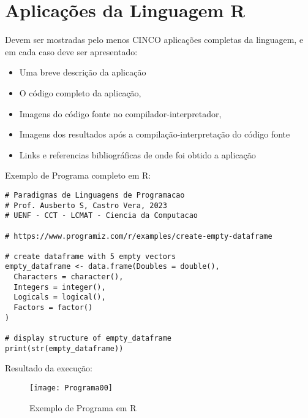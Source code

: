 %


\chapter{ Aplica\c{c}\~{o}es da Linguagem R}

Devem ser mostradas pelo menos CINCO aplica\c{c}\~{o}es completas da linguagem, e em cada caso deve ser apresentado:
\begin{itemize}
  \item Uma breve descri\c{c}\~{a}o da aplica\c{c}\~{a}o
  \item O c\'{o}digo completo da aplica\c{c}\~{a}o,
  \item Imagens do c\'{o}digo fonte no compilador-interpretador,
  \item Imagens dos resultados ap\'{o}s a compila\c{c}\~{a}o-interpreta\c{c}\~{a}o do c\'{o}digo fonte
  \item Links e referencias bibliogr\'{a}ficas de onde foi obtido a aplica\c{c}\~{a}o
\end{itemize}


Exemplo de Programa completo em R:
 \begin{lstlisting}
# Paradigmas de Linguagens de Programacao
# Prof. Ausberto S, Castro Vera, 2023
# UENF - CCT - LCMAT - Ciencia da Computacao

# https://www.programiz.com/r/examples/create-empty-dataframe

# create dataframe with 5 empty vectors
empty_dataframe <- data.frame(Doubles = double(),
  Characters = character(),
  Integers = integer(),
  Logicals = logical(),
  Factors = factor()
)

# display structure of empty_dataframe
print(str(empty_dataframe))
\end{lstlisting}
    
 Resultado da execu\c{c}\~{a}o:
\begin{figure}
  \centering
  \caption{Exemplo de Programa em R} \label{Programa00.png}  
  \texttt{[image: Programa00]}

\end{figure}
    


